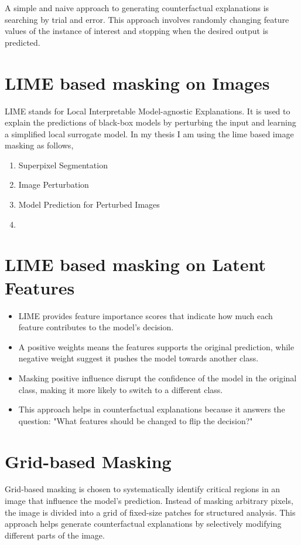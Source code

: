 A simple and naive approach to generating counterfactual explanations is searching by trial and error. This approach involves randomly changing feature values of the instance of interest and stopping when the desired output is predicted.

\section{LIME based masking on Images}
LIME stands for Local Interpretable Model-agnostic Explanations. It is used to explain the predictions of black-box models by perturbing the input and learning a simplified local surrogate model. 
In my thesis I am using the lime based image masking as follows,
\begin{enumerate}
    \item Superpixel Segmentation
    \item Image Perturbation
    \item Model Prediction for Perturbed Images
    \item 
\end{enumerate}


\section{LIME based masking on Latent Features}
\begin{itemize}
    \item LIME provides feature importance scores that indicate how much each feature contributes to the model's decision. 
    \item A positive weights means the features supports the original prediction, while negative weight suggest it pushes the model towards another class.
    \item Masking positive influence disrupt the confidence of the model in the original class, making it more likely to switch to a different class. 
    \item This approach helps in counterfactual explanations because it answers the question: "What features should be changed to flip the decision?"
\end{itemize}

\section{Grid-based Masking}
Grid-based masking is chosen to systematically identify critical regions in an image that influence the model’s prediction. Instead of masking arbitrary pixels, the image is divided into a grid of fixed-size patches for structured analysis. This approach helps generate counterfactual explanations by selectively modifying different parts of the image.

